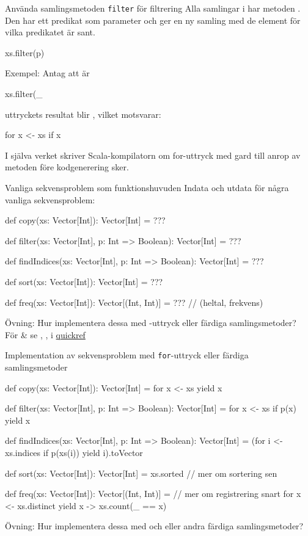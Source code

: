 \begin{Slide}{Använda samlingsmetoden \texttt{filter} för filtrering}
Alla samlingar i  har metoden . Den har ett predikat som parameter  och ger en ny samling med de element för vilka predikatet är sant.
\begin{Code}[basicstyle=\ttfamily\SlideFontSize{12}{14}]
xs.filter(p)
\end{Code}
\pause
Exempel: Antag att  är 
\begin{REPLnonum}
xs.filter(_ %
\end{REPLnonum}
\pause
uttryckets resultat blir , vilket motsvarar:
\begin{Code}[basicstyle=\ttfamily\SlideFontSize{10}{13}]
for x <- xs if x %
\end{Code}
\pause
I själva verket skriver Scala-kompilatorn om for-uttryck med gard till anrop av metoden  före kodgenerering sker.
\end{Slide}


\begin{Slide}{Vanliga sekvensproblem som funktionshuvuden}
Indata och utdata för några vanliga sekvensproblem:
\begin{Code}
def copy(xs: Vector[Int]): Vector[Int] = ???

def filter(xs: Vector[Int], p: Int => Boolean): Vector[Int] = ???

def findIndices(xs: Vector[Int], p: Int => Boolean): Vector[Int] = ???

def sort(xs: Vector[Int]): Vector[Int] = ???

def freq(xs: Vector[Int]): Vector[(Int, Int)] = ???  // (heltal, frekvens)
\end{Code}
Övning: Hur implementera dessa med -uttryck eller färdiga samlingsmetoder?\\
 För \& se , ,  i \href{https://fileadmin.cs.lth.se/pgk/quickref.pdf}{quickref}
\end{Slide}


\begin{Slide}{Implementation av sekvensproblem med \texttt{for}-uttryck eller färdiga samlingsmetoder}
\begin{Code}
def copy(xs: Vector[Int]): Vector[Int] = for x <- xs yield x

def filter(xs: Vector[Int], p: Int => Boolean): Vector[Int] =
  for x <- xs if p(x) yield x

def findIndices(xs: Vector[Int], p: Int => Boolean): Vector[Int] =
  (for i <- xs.indices if p(xs(i)) yield i).toVector

def sort(xs: Vector[Int]): Vector[Int] = xs.sorted // mer om sortering sen

def freq(xs: Vector[Int]): Vector[(Int, Int)] = // mer om registrering snart
  for x <- xs.distinct yield x -> xs.count(_ == x)
\end{Code}
Övning: Hur implementera dessa med  och  eller andra färdiga samlingsmetoder?
\end{Slide}

